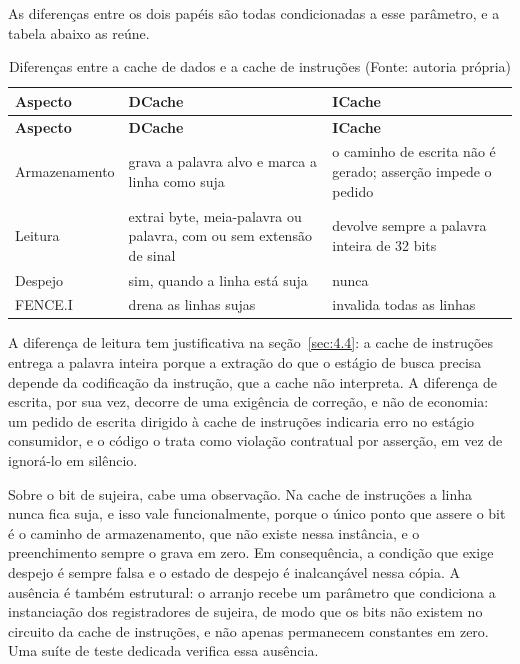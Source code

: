 As diferenças entre os dois papéis são todas condicionadas a esse parâmetro, e a tabela abaixo as reúne.

{\small
\begin{longtable}{@{}>{\raggedright\arraybackslash}p{}>{\raggedright\arraybackslash}p{}>{\raggedright\arraybackslash}p{}@{}}
\caption[Diferenças entre a cache de dados e a cache de instruções]{Diferenças entre a cache de dados e a cache de instruções (Fonte: autoria própria)}\label{tab:5.2}\\
\hline
\textbf{Aspecto} & \textbf{DCache} & \textbf{ICache} \\
\hline
\endfirsthead
\hline
\textbf{Aspecto} & \textbf{DCache} & \textbf{ICache} \\
\hline
\endhead
\hline
\endlastfoot
Armazenamento & grava a palavra alvo e marca a linha como suja & o caminho de escrita não é gerado; asserção impede o pedido \\
Leitura & extrai byte, meia-palavra ou palavra, com ou sem extensão de sinal & devolve sempre a palavra inteira de 32 bits \\
Despejo & sim, quando a linha está suja & nunca \\
FENCE.I & drena as linhas sujas & invalida todas as linhas \\
\end{longtable}
}

A diferença de leitura tem justificativa na seção~\ref{sec:4.4}: a cache de instruções entrega a palavra inteira porque a extração do que o estágio de busca precisa depende da codificação da instrução, que a cache não interpreta. A diferença de escrita, por sua vez, decorre de uma exigência de correção, e não de economia: um pedido de escrita dirigido à cache de instruções indicaria erro no estágio consumidor, e o código o trata como violação contratual por asserção, em vez de ignorá-lo em silêncio.

Sobre o bit de sujeira, cabe uma observação. Na cache de instruções a linha nunca fica suja, e isso vale funcionalmente, porque o único ponto que assere o bit é o caminho de armazenamento, que não existe nessa instância, e o preenchimento sempre o grava em zero. Em consequência, a condição que exige despejo é sempre falsa e o estado de despejo é inalcançável nessa cópia. A ausência é também estrutural: o arranjo recebe um parâmetro que condiciona a instanciação dos registradores de sujeira, de modo que os bits não existem no circuito da cache de instruções, e não apenas permanecem constantes em zero. Uma suíte de teste dedicada verifica essa ausência.

